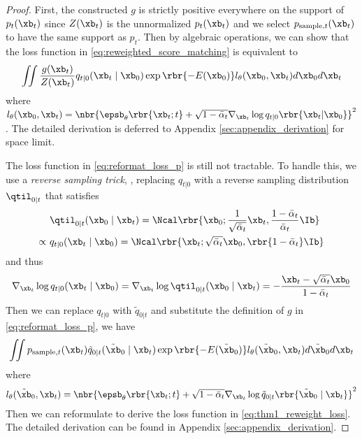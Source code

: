 \begin{proof}
    First, the constructed $g$ is strictly positive everywhere on the support of $p_t(\xb_t)$ since $Z(\xb_t)$ is the unnormalized $p_t(\xb_t)$ and we select $p_{{\rm sample},t}(\xb_t)$ to have the same support as $p_t$. 
    Then by algebraic operations, we can show that the loss function in \eqref{eq:reweighted_score_matching} is equivalent to
    \begin{equation}
        \iint \frac{g(\xb_t)}{Z(\xb_t)}q_{t|0}(\xb_t\mid \xb_0)\exp\rbr{-E(\xb_0)}l_\theta(\xb_0,\xb_t)d\xb_0d\xb_t \label{eq:reformat_loss_p}
    \end{equation}
    where 
    $l_\theta(\xb_0,\xb_t) = \nbr{\epsb_\theta\rbr{\xb_t;t} +\sqrt{1 - \bar\alpha_t} \nabla_{\xb_t}\log q_{t|0}\rbr{\xb_t|\xb_0}}^2$. 
    The detailed derivation is deferred to Appendix \ref{sec:appendix_derivation} for space limit.
    
    The loss function in \eqref{eq:reformat_loss_p} is still not tractable. To handle this, we use a \emph{reverse sampling trick}, \ie, replacing $q_{t|0}$ with a reverse sampling distribution $\qtil_{0|t}$ that satisfies
    \begin{equation}
        \begin{aligned}
        &\qtil_{0|t}(\xb_0\mid \xb_t) =\Ncal\rbr{\xb_0;\frac{1}{\sqrt{\bar\alpha_t}}\xb_t, \frac{1 - \bar\alpha_t}{\bar\alpha_t}\Ib}\\
        \propto~& q_{t|0}(\xb_t\mid \xb_0) = \Ncal\rbr{\xb_t;\sqrt{\bar\alpha_t}\xb_0, \rbr{1 - \bar\alpha_t}\Ib}
    \end{aligned}\label{eq:reverse_gaussian}
    \end{equation}
    and thus
    $$
    \nabla_{\xb_t}\log q_{t|0}(\xb_t\mid \xb_0) = \nabla_{\xb_t}\log \qtil_{0|t}(\xb_0\mid \xb_t) = - \frac{\xb_t -\sqrt{\bar\alpha_t}\xb_0}{1 -\bar\alpha_t}
    $$
    Then we can replace $q_{t|0}$ with $\tilde q_{0|t}$ and substitute the definition of $g$ in \eqref{eq:reformat_loss_p}, we have 
    {
    \small
    $$
    \iint p_{{\rm sample,}t}(\xb_t)\tilde q_{0|t}(\tilde\xb_0\mid \xb_t)\exp\rbr{-E(\tilde\xb_0)}l_\theta(\tilde\xb_0,\xb_t)d\tilde\xb_0d\xb_t 
    $$
    }
    where
    $$
    l_\theta(\tilde\xb_0,\xb_t) = \nbr{\epsb_\theta\rbr{\xb_t;t} +\sqrt{1 - \bar\alpha_t} \nabla_{\xb_t}\log \tilde q_{0|t}\rbr{\tilde\xb_0\mid \xb_t}}^2
    $$
    Then we can reformulate to derive the loss function in \eqref{eq:thm1_reweight_loss}. The detailed derivation can be found in Appendix \ref{sec:appendix_derivation}.
\end{proof}




